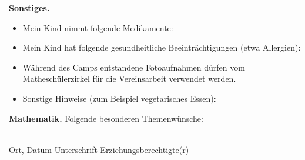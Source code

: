 \documentclass{zettel}
\begin{document}
\begin{shaded}
\textbf{Sonstiges.}
\begin{itemize}
  \item[\checkbox] Mein Kind nimmt folgende Medikamente: \\[1em] \freistLang
  \item[\checkbox] Mein Kind hat folgende gesundheitliche Beeinträchtigungen
  (etwa Allergien): \\[1em] \freistLang
  \item[\checkbox] Während des Camps entstandene Fotoaufnahmen dürfen
  vom Matheschülerzirkel für die Vereinsarbeit verwendet werden.
  \item[\checkbox] Sonstige Hinweise (zum Beispiel vegetarisches Essen): \\[1em]
  \freistLang
\end{itemize}
\end{shaded}

\begin{shaded}
\textbf{Mathematik.} Folgende besonderen Themenwünsche:
\freist{6.2cm}
\end{shaded}

\begin{tabbing}
  \freistMittel \qquad\qquad \= \kill
  \freistMittel \> \freistLaenger \\
  Ort, Datum \> Unterschrift Erziehungsberechtigte(r)
\end{tabbing}
\end{document}
